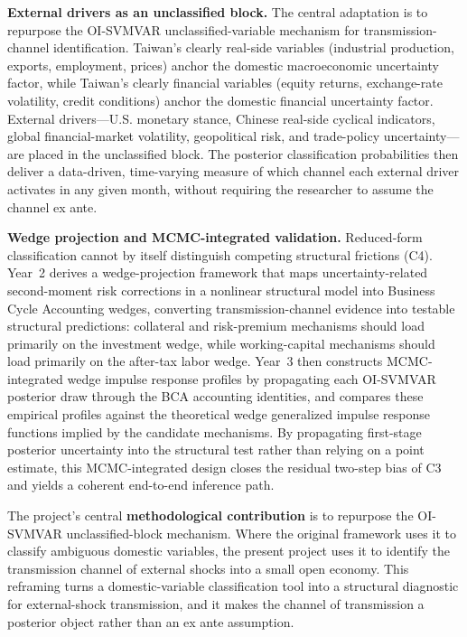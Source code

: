 \documentclass[12pt]{article}
\begin{document}
\textbf{External drivers as an unclassified block.} The central adaptation is to repurpose the OI-SVMVAR unclassified-variable mechanism for transmission-channel identification. Taiwan's clearly real-side variables (industrial production, exports, employment, prices) anchor the domestic macroeconomic uncertainty factor, while Taiwan's clearly financial variables (equity returns, exchange-rate volatility, credit conditions) anchor the domestic financial uncertainty factor. External drivers---U.S. monetary stance, Chinese real-side cyclical indicators, global financial-market volatility, geopolitical risk, and trade-policy uncertainty---are placed in the unclassified block. The posterior classification probabilities then deliver a data-driven, time-varying measure of which channel each external driver activates in any given month, without requiring the researcher to assume the channel ex ante.

\textbf{Wedge projection and MCMC-integrated validation.} Reduced-form classification cannot by itself distinguish competing structural frictions (C4). Year~2 derives a wedge-projection framework that maps uncertainty-related second-moment risk corrections in a nonlinear structural model into Business Cycle Accounting wedges, converting transmission-channel evidence into testable structural predictions: collateral and risk-premium mechanisms should load primarily on the investment wedge, while working-capital mechanisms should load primarily on the after-tax labor wedge. Year~3 then constructs MCMC-integrated wedge impulse response profiles by propagating each OI-SVMVAR posterior draw through the BCA accounting identities, and compares these empirical profiles against the theoretical wedge generalized impulse response functions implied by the candidate mechanisms. By propagating first-stage posterior uncertainty into the structural test rather than relying on a point estimate, this MCMC-integrated design closes the residual two-step bias of C3 and yields a coherent end-to-end inference path.

The project's central \textbf{methodological contribution} is to repurpose the OI-SVMVAR unclassified-block mechanism. Where the original framework uses it to classify ambiguous domestic variables, the present project uses it to identify the transmission channel of external shocks into a small open economy. This reframing turns a domestic-variable classification tool into a structural diagnostic for external-shock transmission, and it makes the channel of transmission a posterior object rather than an ex ante assumption.
\end{document}
